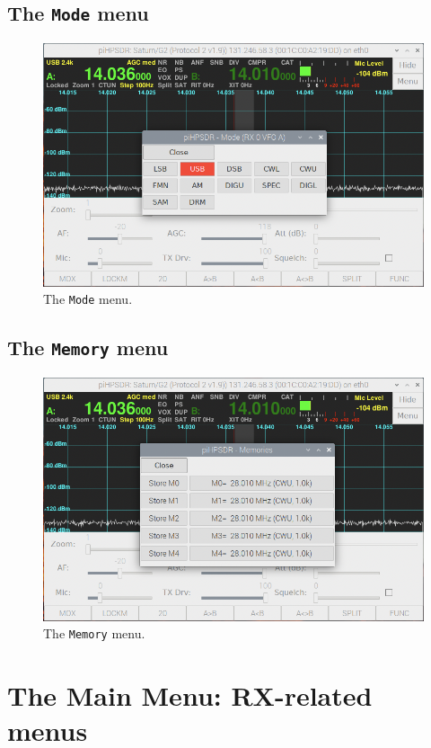 \documentclass[12pt]{book}
\def\bltt#1{\texttt{\color{blue}#1}}
\begin{document}
\section{The \texttt{Mode} menu}
\begin{figure}[h]
\center
\includegraphics[width=12cm]{ModeMenu.png}
\caption{The \bltt{Mode} menu.}
\label{fig:ModeMenu}
\end{figure}

\section{The \texttt{Memory}  menu}
\begin{figure}[h]
\center
\includegraphics[width=12cm]{MemMenu.png}
\caption{The \bltt{Memory} menu.}
\label{fig:MemMenu}
\end{figure}
 
\chapter{The Main Menu: RX-related menus}
\end{document}
